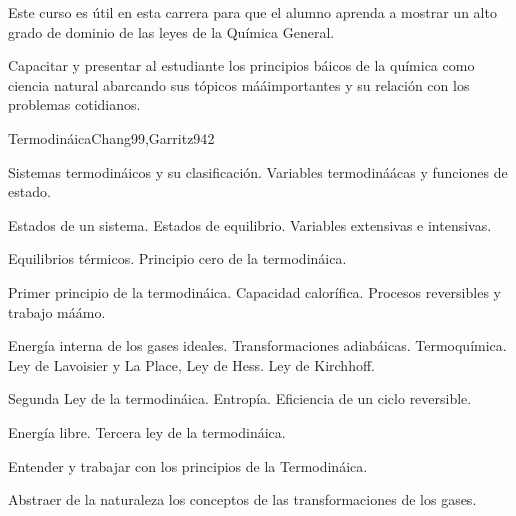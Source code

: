 \begin{syllabus}


\begin{justification}
Este curso es útil en esta carrera para que el alumno aprenda a mostrar un alto grado de dominio de las leyes de la Química General.
\end{justification}

\begin{goals}
\item Capacitar y presentar al estudiante los principios báicos de la química como ciencia natural abarcando sus tópicos mááimportantes y su relación con los problemas cotidianos.
\end{goals}

\begin{outcomes}
\end{outcomes}

\begin{unit}{Termodináica}{Chang99,Garritz94}{2}
\begin{topics}
	\item Sistemas termodináicos y su clasificación. Variables termodináácas y funciones de estado.
	\item Estados de un sistema. Estados de equilibrio. Variables extensivas e intensivas.
	\item Equilibrios térmicos. Principio cero de la termodináica.
	\item Primer principio de la termodináica. Capacidad calorífica. Procesos reversibles y trabajo máámo.
	\item Energía interna de los gases ideales. Transformaciones adiabáicas. Termoquímica. Ley de Lavoisier y La Place, Ley de Hess. Ley de Kirchhoff.
	\item Segunda Ley de la termodináica. Entropía. Eficiencia de un ciclo reversible.
	\item Energía libre. Tercera ley de la termodináica.
\end{topics}

\begin{learningoutcomes}
	\item Entender y trabajar con los principios de la Termodináica.
	\item Abstraer de la naturaleza los conceptos de las transformaciones de los gases.
\end{learningoutcomes}
\end{unit}


\end{syllabus}
